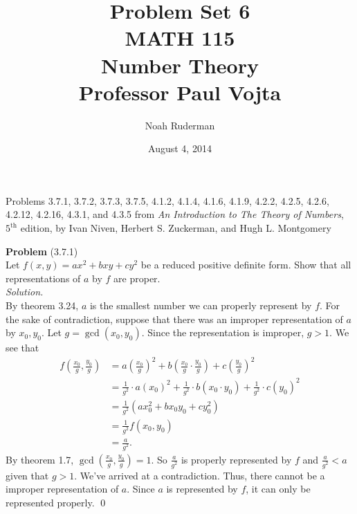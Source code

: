 \documentclass[12 pt]{amsart}
\begin{document}
\normalem %
\allowdisplaybreaks
\title
[Problem Set 6]
{Problem Set 6 \\
MATH 115 \\
Number Theory \\
Professor Paul Vojta}

\author{Noah Ruderman}

\date{ August 4, 2014}

\maketitle
\begin{center}
	Problems 3.7.1, 3.7.2, 3.7.3, 3.7.5, 4.1.2, 4.1.4, 4.1.6, 4.1.9, 4.2.2, 4.2.5, 4.2.6, 4.2.12, 4.2.16, 4.3.1, and 4.3.5 
	from \emph{An Introduction to The Theory of Numbers}, 
	$5^{\text{th}}$ edition,
	by Ivan Niven, Herbert S. Zuckerman, and Hugh L. Montgomery 
\end{center}

\newpage
\phantom{\quad} \vfill
\noindent
\textbf{Problem} (3.7.1) \\[4ex]
  Let $f(x,y) = ax^2 + bxy + cy^2$ be a reduced positive definite form.
  Show that all representations of $a$ by $f$ are proper. 
  \\[2ex]
\emph{Solution.} \\[2ex]
  By theorem 3.24, $a$ is the smallest number we can properly represent
  by $f$.
  For the sake of contradiction, suppose that there was an improper
  representation of $a$ by $x_0, y_0$.
  Let $g = \gcd(x_0, y_0)$. 
  Since the representation is improper, $g > 1$.
  We see that
  \begin{align*}
    f \left( \frac{x_0}{g}, \frac{y_0}{g} \right) 
    &= 
      a \left( \frac{x_0}{g} \right)^2 + 
      b \left( \frac{x_0}{g} \cdot \frac{y_0}{g} \right) + 
      c \left( \frac{y_0}{g} \right)^2 \\
    &= 
      \frac{1}{g^2} \cdot a \left( x_0 \right)^2 + 
      \frac{1}{g^2} \cdot b \left( x_0 \cdot y_0 \right) + 
      \frac{1}{g^2} \cdot c \left( y_0 \right)^2 \\
    &=
      \frac{1}{g^2} \left( ax_0^2 + bx_0y_0 + cy_0^2 \right) \\
    &= 
      \frac{1}{g^2} f(x_0, y_0) \\
    &=
      \frac{a}{g^2}.
  \end{align*}
  By theorem 1.7, $\gcd\left( \frac{x_0}{g}, \frac{y_0}{g} \right) = 1$.
  So $\frac{a}{g^2}$ is properly represented by $f$ and 
  $\frac{a}{g^2} < a$ given that $g > 1$.
  We've arrived at a contradiction.
  Thus, there cannot be a improper representation of $a$.
  Since $a$ is represented by $f$, it can only be represented properly.
  \qed
\vfill
\newpage
\end{document}
